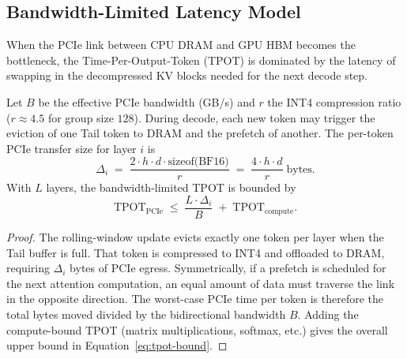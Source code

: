 \subsection{Bandwidth-Limited Latency Model}
\label{subsec:latency-model}

When the PCIe link between CPU DRAM and GPU HBM becomes the bottleneck,
the Time-Per-Output-Token (TPOT) is dominated by the latency of swapping in
the decompressed KV blocks needed for the next decode step.

\begin{theorem}
\label{thm:tpot}
Let $B$ be the effective PCIe bandwidth (GB/s) and $r$ the INT4 compression ratio
($r \approx 4.5$ for group size $128$).  During decode, each new token
may trigger the eviction of one Tail token to DRAM and the prefetch of another.
The per-token PCIe transfer size for layer $i$ is
\begin{equation}
\Delta_i \;=\;
\frac{2 \cdot h \cdot d \cdot \text{sizeof(BF16)}}{r}
\;=\;
\frac{4 \cdot h \cdot d}{r}\;\text{bytes}.
\label{eq:delta-i}
\end{equation}
With $L$ layers, the bandwidth-limited TPOT is bounded by
\begin{equation}
\text{TPOT}_{\text{PCIe}} \;\le\;
\frac{L \cdot \Delta_i}{B}
\;+\;
\text{TPOT}_{\text{compute}}.
\label{eq:tpot-bound}
\end{equation}
\end{theorem}

\begin{proof}
The rolling-window update evicts exactly one token per layer when the Tail
buffer is full.  That token is compressed to INT4 and offloaded to DRAM,
requiring $\Delta_i$ bytes of PCIe egress.  Symmetrically, if a prefetch is
scheduled for the next attention computation, an equal amount of data must
traverse the link in the opposite direction.  The worst-case PCIe time per
token is therefore the total bytes moved divided by the bidirectional bandwidth
$B$.  Adding the compute-bound TPOT (matrix multiplications, softmax, etc.)
gives the overall upper bound in Equation~\eqref{eq:tpot-bound}.
\end{proof}

